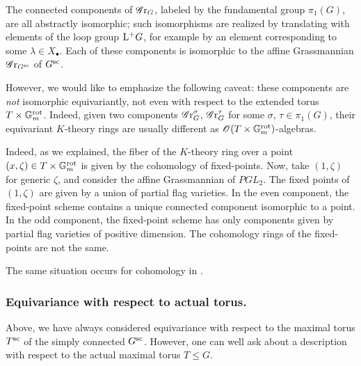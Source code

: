 \begin{remark}
The connected components of $\Gr_G$, labeled by the fundamental group $\pi_1(G)$, are all abstractly isomorphic; such isomorphisms are realized by translating with elements of the loop group $\lop G$, for example by an element corresponding to some $\lambda \in X_{\bullet}$. Each of these components is isomorphic to the affine Grassmannian $\Gr_{G^{\sc}}$ of $G^{\sc}$.

However, we would like to emphasize the following caveat: these components are \textit{not} isomorphic equivariantly, not even with respect to the extended torus $T \times \Gm^{\rot}$. Indeed, given two components $\Gr^{\sigma}_G$, $\Gr^{\tau}_G$ for some $\sigma$, $\tau \in \pi_1(G)$, their equivariant $K$-theory rings are usually different as $\O(T \times \Gm^{\rot})$-algebras.

Indeed, as we explained, the fiber of the $K$-theory ring over a point $(x, \zeta) \in T \times \Gm^{\rot}$ is given by the cohomology of fixed-points. Now, take $(1, \zeta)$ for generic $\zeta$, and consider the affine Grassmannian of $PGL_2$. The fixed points of $(1, \zeta)$ are given by a union of partial flag varieties. In the even component, the fixed-point scheme contains a unique connected component isomorphic to a point. In the odd component, the fixed-point scheme has only components given by partial flag varieties of positive dimension. The cohomology rings of the fixed-points are not the same.

The same situation occurs for cohomology in \cite[\S 3, proof of Theorem 1.(b)]{BF07}.
\end{remark}






\subsubsection{Equivariance with respect to actual torus.}
Above, we have always considered equivariance with respect to the maximal torus $T^{\sc}$ of the simply connected $G^{\sc}$. However, one can well ask about a description with respect to the actual maximal torus $T \leq G$. 

